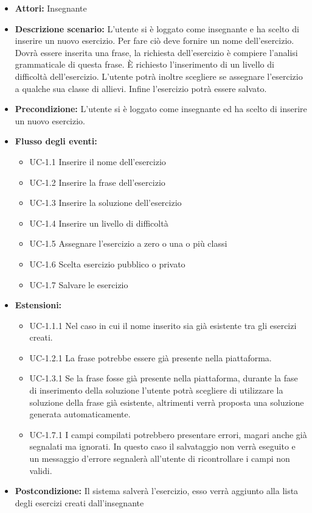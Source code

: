 	\begin{itemize}
		\item \textbf{Attori: } Insegnante
		\item \textbf{Descrizione scenario: } L'utente si è loggato come insegnante e ha scelto di inserire un nuovo esercizio. Per fare ciò deve fornire un nome dell'esercizio. Dovrà essere inserita una frase, la richiesta dell'esercizio è compiere l'analisi grammaticale di questa frase. È richiesto l'inserimento di un livello di difficoltà dell'esercizio. L'utente potrà inoltre scegliere se assegnare l'esercizio a qualche sua classe di allievi.
Infine l'esercizio potrà essere salvato.
		\item \textbf{Precondizione: }L'utente si è loggato come insegnante ed ha scelto di inserire un nuovo esercizio.
		\item \textbf{Flusso degli eventi: }
		\begin{itemize}
		\item UC-1.1 Inserire il nome dell'esercizio
		\item UC-1.2 Inserire la frase dell'esercizio
		\item UC-1.3 Inserire la soluzione dell'esercizio
		\item UC-1.4 Inserire un livello di difficoltà
		\item UC-1.5 Assegnare l'esercizio a zero o una o più classi
		\item UC-1.6 Scelta esercizio pubblico o privato
		\item UC-1.7 Salvare le esercizio
		\end{itemize}
		\item \textbf{Estensioni: }
		\begin{itemize}
		\item UC-1.1.1 Nel caso in cui il nome inserito sia già esistente tra gli esercizi creati.
		\item UC-1.2.1 La frase potrebbe essere già presente nella piattaforma.
		\item UC-1.3.1 Se la frase fosse già presente nella piattaforma, durante la fase di inserimento della soluzione l'utente potrà scegliere di utilizzare la soluzione della frase già esistente, altrimenti verrà proposta una soluzione generata automaticamente.
		\item UC-1.7.1 I campi compilati potrebbero presentare errori, magari anche già segnalati ma ignorati. In questo caso il salvataggio non verrà eseguito e un messaggio d'errore segnalerà all'utente di ricontrollare i campi non validi.
		\end{itemize}
		\item \textbf{Postcondizione: }Il sistema salverà l'esercizio, esso verrà aggiunto alla lista degli esercizi creati dall'insegnante
	\end{itemize}
